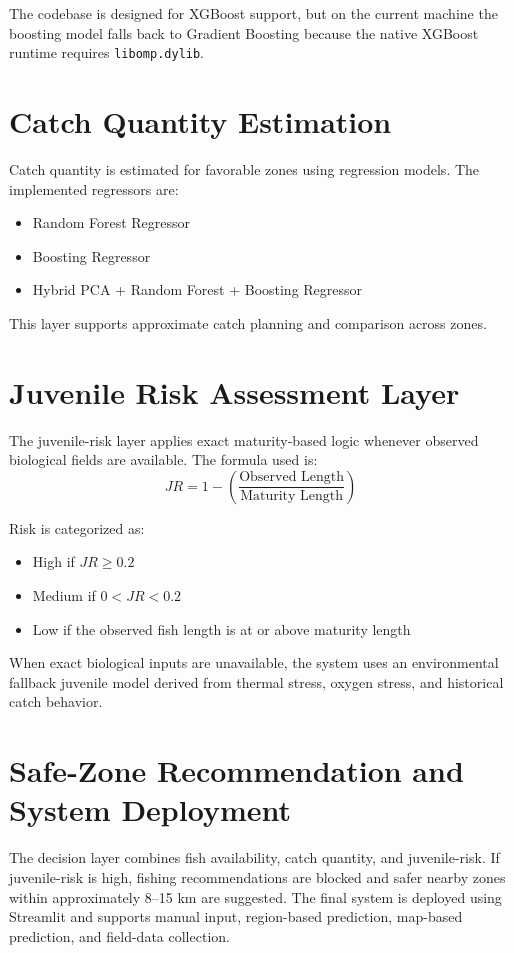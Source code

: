 \documentclass[12pt,a4paper]{report}
\begin{document}
The codebase is designed for XGBoost support, but on the current machine the boosting model falls back to Gradient Boosting because the native XGBoost runtime requires \texttt{libomp.dylib}.

\section{Catch Quantity Estimation}
Catch quantity is estimated for favorable zones using regression models. The implemented regressors are:
\begin{itemize}[leftmargin=1.5cm]
    \item Random Forest Regressor
    \item Boosting Regressor
    \item Hybrid PCA + Random Forest + Boosting Regressor
\end{itemize}
This layer supports approximate catch planning and comparison across zones.

\section{Juvenile Risk Assessment Layer}
The juvenile-risk layer applies exact maturity-based logic whenever observed biological fields are available. The formula used is:
\[
JR = 1 - \left(\frac{\text{Observed Length}}{\text{Maturity Length}}\right)
\]

Risk is categorized as:
\begin{itemize}[leftmargin=1.5cm]
    \item High if $JR \geq 0.2$
    \item Medium if $0 < JR < 0.2$
    \item Low if the observed fish length is at or above maturity length
\end{itemize}

When exact biological inputs are unavailable, the system uses an environmental fallback juvenile model derived from thermal stress, oxygen stress, and historical catch behavior.

\section{Safe-Zone Recommendation and System Deployment}
The decision layer combines fish availability, catch quantity, and juvenile-risk. If juvenile-risk is high, fishing recommendations are blocked and safer nearby zones within approximately 8--15 km are suggested. The final system is deployed using Streamlit and supports manual input, region-based prediction, map-based prediction, and field-data collection.
\end{document}
